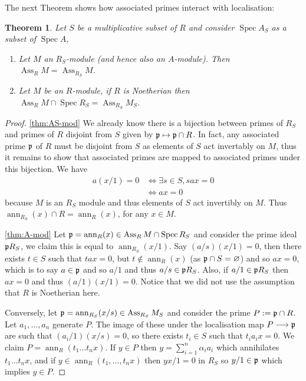 \documentclass[12pt]{article}
\theoremstyle{plain}
\newtheorem{thm}{Theorem}[subsection] %
\theoremstyle{definition}
\newcommand{\lto}{\longrightarrow}
\begin{document}
	The next Theorem shows how associated primes interact with localisation:
	\begin{thm}
		\label{thm:primes_loc_interact}
		Let $S$ be a multiplicative subset of $R$ and consider $\operatorname{Spec}A_S$ as a subset of $\operatorname{Spec}A$,
		\begin{enumerate}
			\item\label{thm:AS-mod} Let $M$ an $R_S$-module (and hence also an $A$-module). Then $\operatorname{Ass}_RM = \operatorname{Ass}_{R_S}M$.
			\item\label{thm:A-mod} Let $M$ be an $R$-module, if $R$ is Noetherian then $\operatorname{Ass}_RM \cap \operatorname{Spec}R_S = \operatorname{Ass}_{R_S}M_S$.
		\end{enumerate}
	\end{thm}
	\begin{proof}
		\eqref{thm:AS-mod} We already know there is a bijection between primes of $R_S$ and primes of $R$ disjoint from $S$ given by $\frak{p} \mapsto \frak{p} \cap R$. In fact, any associated prime $\frak{p}$ of $R$ must be disjoint from $S$ as elements of $S$ act invertably on $M$, thus it remains to show that associated primes are mapped to associated primes under this bijection. We have
		\begin{align*}
			a(x/1) = 0 &\Leftrightarrow \exists s \in S,\text{}sax = 0\\
			&\Leftrightarrow ax = 0
		\end{align*}
		because $M$ is an $R_S$ module and thus elements of $S$ act invertibly on $M$. Thus $\operatorname{ann}_{R_S}(x) \cap R = \operatorname{ann}_{R}(x)$, for any $x \in M$.
		
		\eqref{thm:A-mod} Let $\frak{p} = \operatorname{ann}_R(x) \in \operatorname{Ass}_RM \cap \operatorname{Spec}R_S$ and consider the prime ideal $\frak{p}R_S$, we claim this is equal to $\operatorname{ann}_{R_S}(x/1)$. Say $(a/s)(x/1) = 0$, then there exists $t \in S$ such that $tax = 0$, but $t \not\in \operatorname{ann}_R(x)$ (as $\frak{p} \cap S = \varnothing$) and so $ax = 0$, which is to say $a \in \frak{p}$ and so $a/1$ and thus $a/s \in \frak{p}R_S$. Also, if $a/1 \in \frak{p}R_S$ then $ax = 0$ and thus $(a/1)(x/1) = 0$. Notice that we did not use the assumption that $R$ is Noetherian here.
		
		Conversely, let $\frak{p} = \operatorname{ann}_{R_S}(x/s) \in \operatorname{Ass}_{R_S}M_S$ and consider the prime $P := \frak{p} \cap R$. Let $a_1,...,a_n$ generate $P$. The image of these under the localisation map $P \lto \frak{p}$ are such that $(a_i/1)(x/s) = 0$, so there exists $t_i \in S$ such that $t_i a_i x = 0$. We claim $P = \operatorname{ann}_R(t_1...t_nx)$. If $y \in P$ then $y = \sum_{i = 1}^n \alpha_i a_i$ which annihilates $t_1...t_nx$, and if $y \in \operatorname{ann}_R(t_1,...,t_nx)$ then $yx/1 = 0$ in $R_S$ so $y/1 \in \frak{p}$ which implies $y \in P$.
	\end{proof}
\end{document}
